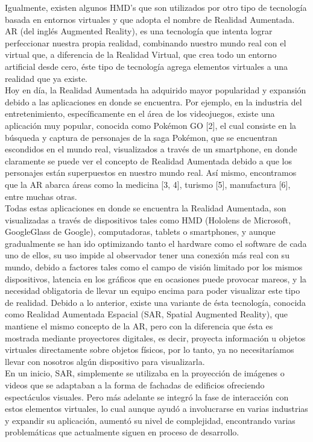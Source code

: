 \documentclass[a4paper,openright,12pt]{report}
\begin{document}
Igualmente, existen algunos HMD’s que son utilizados por otro tipo de tecnología basada en entornos virtuales y que adopta el nombre de Realidad Aumentada.\\
AR (del inglés Augmented Reality), es una tecnología que intenta lograr perfeccionar nuestra propia realidad, combinando nuestro mundo real con el virtual que, a diferencia de la Realidad Virtual, que crea todo un entorno artificial desde cero, éste tipo de tecnología agrega elementos virtuales a una realidad que ya existe.\\
Hoy en día, la Realidad Aumentada ha adquirido mayor popularidad y expansión debido a las aplicaciones en donde se encuentra. Por ejemplo, en la industria del entretenimiento, específicamente en el área de los videojuegos, existe una aplicación muy popular, conocida como Pokémon GO [2], el cual consiste en la búsqueda y captura de personajes de la saga Pokémon, que se encuentran escondidos en el mundo real, visualizados a través de un smartphone, en donde claramente se puede ver el concepto de Realidad Aumentada debido a que los personajes están superpuestos en nuestro mundo real. Así mismo, encontramos que la AR abarca áreas como la medicina [3, 4], turismo [5], manufactura [6], entre muchas otras.\\
Todas estas aplicaciones en donde se encuentra la Realidad Aumentada, son visualizadas a través de dispositivos tales como HMD (Hololens de Microsoft, GoogleGlass de Google), computadoras, tablets o smartphones, y aunque gradualmente se han ido optimizando tanto el hardware como el software de cada uno de ellos, su uso impide al observador tener una conexión más real con su mundo, debido a factores tales como el campo de visión limitado por los mismos dispositivos, latencia en los gráficos que en ocasiones puede provocar mareos, y la necesidad obligatoria de llevar un equipo encima para poder visualizar este tipo de realidad. Debido a lo anterior, existe una variante de ésta tecnología, conocida como Realidad Aumentada Espacial (SAR, Spatial Augmented Reality), que mantiene el mismo concepto de la AR, pero con la diferencia que ésta es mostrada mediante proyectores digitales, es decir, proyecta información u objetos virtuales directamente sobre objetos físicos, por lo tanto, ya no necesitaríamos llevar con nosotros algún dispositivo para visualizarla.\\
En un inicio, SAR, simplemente se utilizaba en la proyección de imágenes o videos que se adaptaban a la forma de fachadas de edificios ofreciendo espectáculos visuales. Pero más adelante se integró la fase de interacción con estos elementos virtuales, lo cual aunque ayudó a involucrarse en varias industrias y expandir su aplicación, aumentó su nivel de complejidad, encontrando varias problemáticas que actualmente siguen en proceso de desarrollo.
\end{document}

